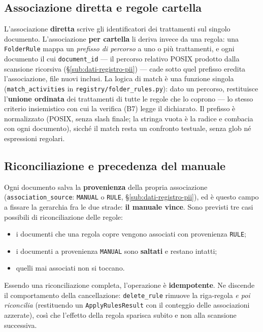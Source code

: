 \subsection{Associazione diretta e regole cartella}
\label{sub:impl-b6-regole}

L'associazione \textbf{diretta} scrive gli identificatori dei trattamenti sul singolo documento. L'associazione \textbf{per cartella} li deriva invece da una regola: una \texttt{FolderRule} mappa un \emph{prefisso di percorso} a uno o più trattamenti, e ogni documento il cui \texttt{document\_id} --- il percorso relativo POSIX prodotto dalla scansione ricorsiva (§\ref{sub:dati-registro-pii}) --- cade sotto quel prefisso eredita l'associazione, file nuovi inclusi. La logica di match è una funzione singola (\texttt{match\_activities} in \texttt{registry/folder\_rules.py}): dato un percorso, restituisce l'\textbf{unione ordinata} dei trattamenti di tutte le regole che lo coprono --- lo stesso criterio insiemistico con cui la verifica (B7) legge il dichiarato. Il prefisso è normalizzato (POSIX, senza slash finale; la stringa vuota è la radice e combacia con ogni documento), sicché il match resta un confronto testuale, senza glob né espressioni regolari.

\subsection{Riconciliazione e precedenza del manuale}
\label{sub:impl-b6-riconciliazione}

Ogni documento salva la \textbf{provenienza} della propria associazione (\texttt{association\_source}: \texttt{MANUAL} o \texttt{RULE}, §\ref{sub:dati-registro-pii}), ed è questo campo a fissare la gerarchia fra le due strade: \textbf{il manuale vince}. Sono previsti tre casi possibili di riconciliazione delle regole:
\begin{itemize}
	\item i documenti che una regola copre vengono associati con provenienza \texttt{RULE};
	\item i documenti a provenienza \texttt{MANUAL} sono \textbf{saltati} e restano intatti;
	\item quelli mai associati non si toccano.
\end{itemize}

Essendo una riconciliazione completa, l'operazione è \textbf{idempotente}. Ne discende il comportamento della cancellazione: \texttt{delete\_rule} rimuove la riga-regola \emph{e poi riconcilia} (restituendo un \texttt{ApplyRulesResult} con il conteggio delle associazioni azzerate), così che l'effetto della regola sparisca subito e non alla scansione successiva.


